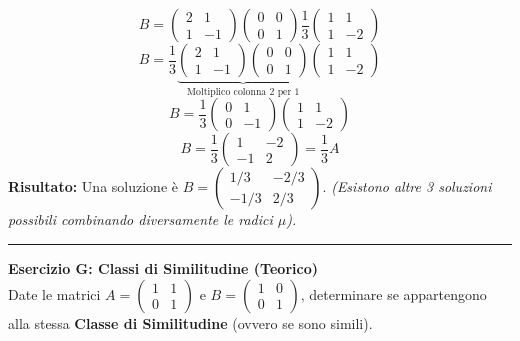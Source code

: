 \documentclass[10pt,a4paper]{article}
\begin{document}
\[ B = \begin{pmatrix} 2 & 1 \\ 1 & -1 \end{pmatrix} \begin{pmatrix} 0 & 0 \\ 0 & 1 \end{pmatrix} \frac{1}{3} \begin{pmatrix} 1 & 1 \\ 1 & -2 \end{pmatrix} \]
\[ B = \frac{1}{3} \underbrace{\begin{pmatrix} 2 & 1 \\ 1 & -1 \end{pmatrix} \begin{pmatrix} 0 & 0 \\ 0 & 1 \end{pmatrix}}_{\text{Moltiplico colonna 2 per 1}} \begin{pmatrix} 1 & 1 \\ 1 & -2 \end{pmatrix} \]
\[ B = \frac{1}{3} \begin{pmatrix} 0 & 1 \\ 0 & -1 \end{pmatrix} \begin{pmatrix} 1 & 1 \\ 1 & -2 \end{pmatrix} \]
\[ B = \frac{1}{3} \begin{pmatrix} 1 & -2 \\ -1 & 2 \end{pmatrix} = \frac{1}{3} A \]
\textbf{Risultato:} Una soluzione è $B = \begin{pmatrix} 1/3 & -2/3 \\ -1/3 & 2/3 \end{pmatrix}$.
\textit{(Esistono altre 3 soluzioni possibili combinando diversamente le radici $\mu$).}

\vspace{0.4cm}
\hrule
\vspace{0.4cm}

\textbf{Esercizio G: Classi di Similitudine (Teorico)}
\\ Date le matrici $A = \begin{pmatrix} 1 & 1 \\ 0 & 1 \end{pmatrix}$ e $B = \begin{pmatrix} 1 & 0 \\ 0 & 1 \end{pmatrix}$, determinare se appartengono alla stessa \textbf{Classe di Similitudine} (ovvero se sono simili).
\end{document}
